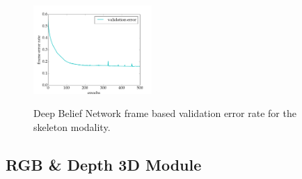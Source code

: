 
\begin{figure}[t]
  \centering
  \includegraphics[width=0.4\textwidth]{images/sk_training_error}\\
  \caption{
    Deep Belief Network frame based validation error rate for the skeleton modality.
    }
    \label{sk_error_rate}
\end{figure}

\subsection{RGB \& Depth 3D Module} \label{sec:rgbd_modules}
